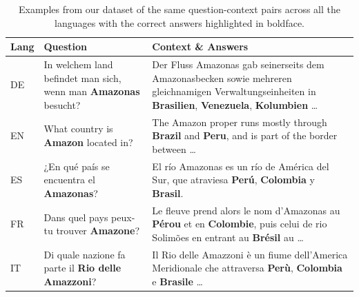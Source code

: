 \begin{table}[t]
\fontsize{12}{12}\selectfont
\centering
\begin{adjustbox}{width=\textwidth}
\begin{tabular}{p{0.75cm}p{4cm}p{10cm}}%
\toprule
Lang & Question                                                      & Context \& Answers                                                                                                                                                                                                                      \\ \midrule
DE       & In welchem land befindet man sich, wenn man \textbf{Amazonas} besucht? & Der Fluss Amazonas gab seinerseits dem Amazonasbecken sowie mehreren gleichnamigen Verwaltungseinheiten in \textbf{Brasilien}, \textbf{Venezuela}, \textbf{Kolumbien} \dots                                                                         \\ \midrule
EN       & What country is \textbf{Amazon} located in?                            & The Amazon proper runs mostly through \textbf{Brazil} and \textbf{Peru}, and is part of the border between \dots                                                                                                                             \\ \midrule
ES       & ¿En qué país se encuentra el \textbf{Amazonas}?                        & El río Amazonas es un río de América del Sur, que atraviesa \textbf{Perú}, \textbf{Colombia} y \textbf{Brasil}.                                                                                                                       \\ \midrule
FR       & Dans quel pays peux-tu trouver \textbf{Amazone}?                       & Le fleuve prend alors le nom d'Amazonas au \textbf{Pérou} et en \textbf{Colombie}, puis celui de rio Solimões en entrant au \textbf{Brésil} au \dots \\ \midrule
IT       & Di quale nazione fa parte il \textbf{Rio delle Amazzoni}?              & Il Rio delle Amazzoni è un fiume dell'America Meridionale che attraversa \textbf{Perù}, \textbf{Colombia} e \textbf{Brasile} \dots                                                                    \\ 
\bottomrule
\end{tabular}
\end{adjustbox}
\caption{Examples from our dataset of the same question-context pairs across all the languages with the correct answers highlighted in boldface.}
\label{table:qa_examples}
\end{table}



